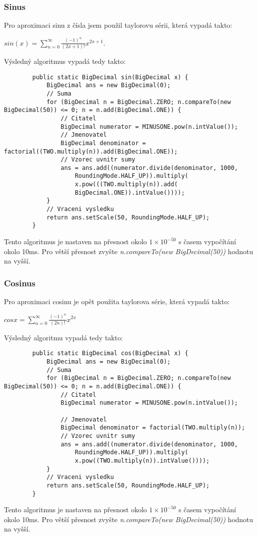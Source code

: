 \documentclass{article}
\begin{document}
    \subsubsection{Sinus}
    Pro aproximaci sinu z čísla jsem použil taylorovu sérii, která vypadá takto:
    \begin{center}
        $sin(x) = \displaystyle\sum_{n=0}^{\infty} \frac{(-1)^n}{(2x+1)!}x^{2x+1}$.
    \end{center}
    Výsledný algoritmus vypadá tedy takto:
    \sloppy
    \begin{lstlisting}
        public static BigDecimal sin(BigDecimal x) {
            BigDecimal ans = new BigDecimal(0);
            // Suma
            for (BigDecimal n = BigDecimal.ZERO; n.compareTo(new BigDecimal(50)) <= 0; n = n.add(BigDecimal.ONE)) {
                // Citatel
                BigDecimal numerator = MINUSONE.pow(n.intValue());
                // Jmenovatel
                BigDecimal denominator = factorial((TWO.multiply(n)).add(BigDecimal.ONE));
                // Vzorec uvnitr sumy
                ans = ans.add((numerator.divide(denominator, 1000, 
                    RoundingMode.HALF_UP)).multiply(
                    x.pow(((TWO.multiply(n)).add(
                    BigDecimal.ONE)).intValue())));
            }
            // Vraceni vysledku
            return ans.setScale(50, RoundingMode.HALF_UP);
        }
    \end{lstlisting}
    Tento algoritmus je nastaven na přesnost okolo $1\times{10^{-50}}$ s časem vypočítání okolo 10ms. Pro
    větší přesnost zvyšte \textit{n.compareTo(new BigDecimal(50))} hodnotu na vyšší.
    \subsubsection{Cosinus}
    Pro aproximaci cosinu je opět použita taylorova série, která vypadá takto:
    \begin{center}
        $cos x = \displaystyle\sum_{n=0}^{\infty} \frac{(-1)^n}{(2n)!}x^{2x}$
    \end{center}
    Výsledný algoritmu vypadá tedy takto:
    \sloppy
    \begin{lstlisting}
        public static BigDecimal cos(BigDecimal x) { 
            BigDecimal ans = new BigDecimal(0);
            // Suma
            for (BigDecimal n = BigDecimal.ZERO; n.compareTo(new BigDecimal(50)) <= 0; n = n.add(BigDecimal.ONE)) {
                // Citatel
                BigDecimal numerator = MINUSONE.pow(n.intValue());

                // Jmenovatel
                BigDecimal denominator = factorial(TWO.multiply(n));
                // Vzorec uvnitr sumy
                ans = ans.add((numerator.divide(denominator, 1000, 
                    RoundingMode.HALF_UP)).multiply(
                    x.pow((TWO.multiply(n)).intValue())));
            }
            // Vraceni vysledku
            return ans.setScale(50, RoundingMode.HALF_UP);  
        }
    \end{lstlisting}
    Tento algoritmus je nastaven na přesnost okolo $1\times{10^{-50}}$ s časem vypočítání okolo 10ms. Pro
    větší přesnost zvyšte \textit{n.compareTo(new BigDecimal(50))} hodnotu na vyšší.
\end{document}
